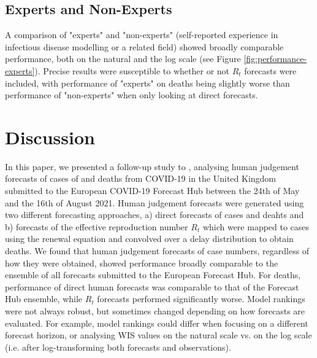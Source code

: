 \documentclass[10pt,a4paper,twocolumn]{article}
\begin{document}
\subsection*{Experts and Non-Experts}

A comparison of "experts" and "non-experts" (self-reported experience in infectious disease modelling or a related field) showed broadly comparable performance, both on the natural and the log scale (see Figure \ref{fig:performance-experts}). Precise results were susceptible to whether or not $R_t$ forecasts were included, with performance of "experts" on deaths being slightly worse than performance of "non-experts" when only looking at direct forecasts. 


\section*{Discussion}


In this paper, we presented a follow-up study to \cite{bosseComparingHumanModelbased2022}, analysing human judgement forecasts of cases of and deaths from COVID-19 in the United Kingdom submitted to the European COVID-19 Forecast Hub between the 24th of May and the 16th of August 2021. Human judgement forecasts were generated using two different forecasting approaches, a) direct forecasts of cases and deahts and b) forecasts of the effective reproduction number $R_t$ which were mapped to cases using the renewal equation and convolved over a delay distribution to obtain deaths. We found that human judgement forecasts of case numbers, regardless of how they were obtained, showed performance broadly comparable to the ensemble of all forecasts submitted to the European Forecast Hub. For deaths, performance of direct human forecasts was comparable to that of the Forecast Hub ensemble, while $R_t$ forecasts performed significantly worse. Model rankings were not always robust, but sometimes changed depending on how forecasts are evaluated. For example, model rankings could differ when focusing on a different forecast horizon, or analysing WIS values on the natural scale vs. on the log scale (i.e. after log-transforming both forecasts and observations). 
\end{document}

